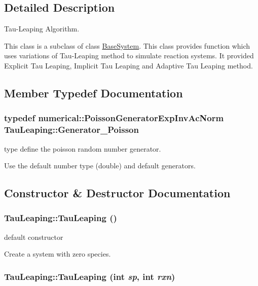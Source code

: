 \subsection{Detailed Description}
Tau-Leaping Algorithm. 

This class is a subclass of class \hyperlink{class_base_system}{BaseSystem}. This class provides function which uses variations of Tau-Leaping method to simulate reaction systems. It provided Explicit Tau Leaping, Implicit Tau Leaping and Adaptive Tau Leaping method. 

\subsection{Member Typedef Documentation}
\hypertarget{class_tau_leaping_4d5a24c9b87da3c1a87272f131a8f896}{
\subsubsection{\setlength{\rightskip}{0pt plus 5cm}typedef numerical::PoissonGeneratorExpInvAcNorm {\bf TauLeaping::Generator\_\-Poisson}}}
\label{class_tau_leaping_4d5a24c9b87da3c1a87272f131a8f896}


type define the poisson random number generator. 

Use the default number type (double) and default generators. 

\subsection{Constructor \& Destructor Documentation}
\hypertarget{class_tau_leaping_0b7100b89eabbf43b3a4a4b9de08ae8d}{
\subsubsection{\setlength{\rightskip}{0pt plus 5cm}TauLeaping::TauLeaping ()}}
\label{class_tau_leaping_0b7100b89eabbf43b3a4a4b9de08ae8d}


default constructor 

Create a system with zero species. \hypertarget{class_tau_leaping_55c19c05a81f7d15dcc0e90b9d94ad40}{
\subsubsection{\setlength{\rightskip}{0pt plus 5cm}TauLeaping::TauLeaping (int {\em sp}, \/  int {\em rxn})}}
\label{class_tau_leaping_55c19c05a81f7d15dcc0e90b9d94ad40}


